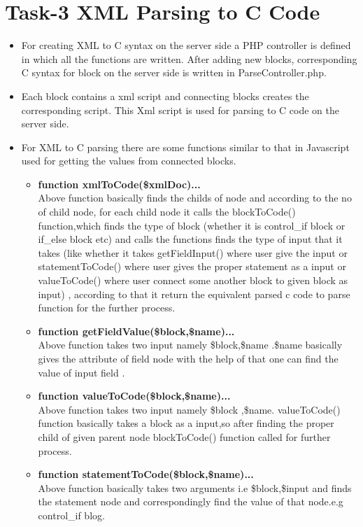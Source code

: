 \documentclass[a4paper,10pt]{report}
\begin{document}
\section{Task-3 XML Parsing to C Code}
  \begin{itemize}
	\item
	For creating XML to C syntax on the server side a PHP controller is defined in which all the functions are written.
	After adding new blocks, corresponding C syntax for block on the server side is written in ParseController.php. 
	\item
	Each block contains a xml script and connecting blocks creates the corresponding script. This Xml script is used for parsing to C code on the server side.
	\item
	For XML to C parsing there are some functions similar to that in Javascript used for getting the values from connected blocks.
	 \begin{itemize}
	   \item\textbf{function xmlToCode(\$xmlDoc){...}}\\
	   Above function basically finds the childs of node and according to the no of child node, for each child node it calls the blockToCode() function,which finds the type of block (whether it is control\_if block or if\_else block etc) and calls the functions finds the type of input that it takes (like whether it takes getFieldInput() where user give the input or statementToCode() where user gives the proper statement as a input or valueToCode() where user connect some another block to given block as input) , according to that it return the equivalent parsed c code to parse function for the further process.\\
	   \item\textbf{function getFieldValue(\$block,\$name){...}}\\
	   Above function takes two input namely \$block,\$name .\$name basically gives the attribute of field node with the help of that one can find the value of input field .\\
	   \item
	   \textbf{function valueToCode(\$block,\$name){...}}\\
	   Above function takes two input namely \$block ,\$name. valueToCode() function basically takes a block as a input,so after finding the proper child of given parent node blockToCode() function called for further process.\\
	   \item\textbf{function statementToCode(\$block,\$name){...}}\\
	   Above function basically takes two arguments i.e \$block,\$input and finds the statement node and correspondingly find the value of that node.e.g control\_if blog.\\
	 \end{itemize}
  \end{itemize}
\end{document}
